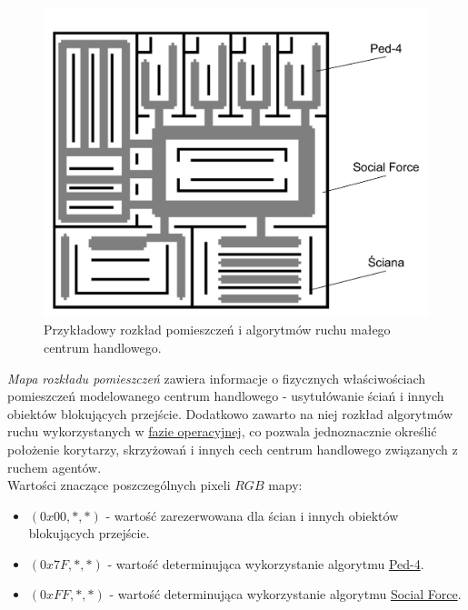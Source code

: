 \documentclass[a4paper, 12pt]{article}
\begin{document}
        \begin{figure}[H]
            \centering
            \includegraphics[scale=0.3]{./img/MallLayout.pdf}
            \caption{Przykładowy rozkład pomieszczeń i algorytmów ruchu małego centrum handlowego.}
            \label{fig:mall-layout}
        \end{figure}

        \emph{Mapa rozkładu pomieszczeń} zawiera informacje o fizycznych właściwościach pomieszczeń modelowanego centrum handlowego - usytułówanie ściań i innych obiektów blokujących przejście. Dodatkowo zawarto na niej rozkład algorytmów ruchu wykorzystanych w \hyperref[sec:operational]{fazie operacyjnej}, co pozwala jednoznacznie określić położenie korytarzy, skrzyżowań i innych cech centrum handlowego związanych z ruchem agentów. \\

\noindent
Wartości znaczące poszczególnych pixeli $RGB$ mapy:

        \begin{itemize}
            \item $(0x00, *, *)$ - wartość zarezerwowana dla ścian i innych obiektów blokujących przejście.
            \item $(0x7F, *, *)$ - wartość determinująca wykorzystanie algorytmu \hyperref[sec:movement-impl]{Ped-4}.
            \item $(0xFF, *, *)$ - wartość determinująca wykorzystanie algorytmu \hyperref[sec:social-force-impl]{Social Force}.
        \end{itemize}
\end{document}
